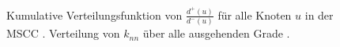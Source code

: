 \begin{figure}[th!]
  \centering
  \caption{Kumulative Verteilungsfunktion von $\frac{d^+(u)}{d^-(u)}$
    f\"ur alle Knoten $u$ in der MSCC
    . Verteilung von $k_{nn}$ \"uber alle
    ausgehenden Grade .}
  \label{fig:degree-correlation}
\end{figure}

